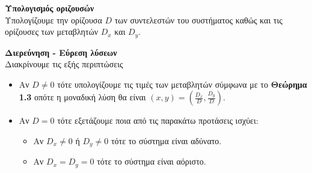 \documentclass[twoside,nofonts,internet,math,spyros]{frontisthrio}
\begin{document}
\begin{arithmisi}
\begin{bhma}
\item \textbf{Υπολογισμός οριζουσών}\\
Υπολογίζουμε την ορίζουσα $ D $ των συντελεστών του συστήματος καθώς και τις ορίζουσες των μεταβλητών $ D_x $ και $ D_y $.
\item \textbf{Διερεύνηση - Εύρεση λύσεων}\\
Διακρίνουμε τις εξής περιπτώσεις
\begin{itemize}
\item Αν $ D\neq0 $ τότε υπολογίζουμε τις τιμές των μεταβλητών σύμφωνα με το \textbf{Θεώρημα 1.3} οπότε η μοναδική λύση θα είναι $ (x,y)=\left(\frac{D_x}{D},\frac{D_y}{D} \right) $.
\item Αν $ D=0 $ τότε εξετάζουμε ποια από τις παρακάτω προτάσεις ισχύει:
\begin{itemize}
\item Αν $ D_x\neq 0 $ ή $ D_y\neq 0 $ τότε το σύστημα είναι αδύνατο.
\item Αν $ D_x=D_y=0 $ τότε το σύστημα είναι αόριστο.
\end{itemize}
\end{itemize}
\end{bhma}
\end{arithmisi}
\newpage
\end{document}
